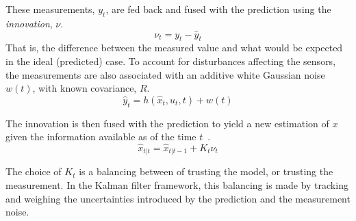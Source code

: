     These measurements, $y_{t}$, are fed back and fused with the
    prediction using the \textit{innovation}, $\nu$.
    \begin{equation}
        \nu_{t} = y_{t} - \hat{y}_{t}
    \end{equation}
    That is, the difference between the measured value and what would be
    expected in the ideal (predicted) case.
    To account for disturbances affecting the sensors, the measurements
    are also associated with an additive white Gaussian noise $w(t)$, with
    known covariance, $R$.
    \begin{equation}
        \hat{y}_{t} = h(\hat{x}_{t}, u_{t}, t) + w(t)
    \end{equation}

    The innovation is then fused with the prediction to yield a new
    estimation of $x$ given the
    information available as of the time $t$~\citep{gustafsson2010statistical}.
    \begin{equation}
        \hat{x}_{t|t} = \hat{x}_{t|t-1} + K_{t}\nu_{t}
    \end{equation}

    The choice of $K_{t}$ is a balancing between of trusting the model,
    or trusting the measurement. In the Kalman filter framework,
    this balancing is made by tracking and weighing the uncertainties
    introduced by the prediction and the measurement noise.

